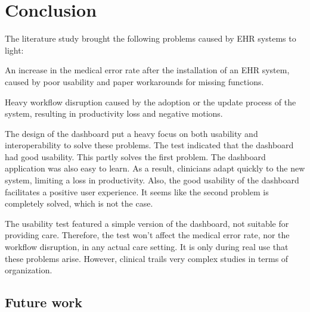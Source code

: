 \section{Conclusion}

The literature study brought the following problems caused by EHR systems to light:
\begin{myitemize}
    \item An increase in the medical error rate after the installation of an EHR system, caused by poor usability and paper workarounds for missing functions.
    \item Heavy workflow disruption caused by the adoption or the update process of the system, resulting in productivity loss and negative motions.
\end{myitemize}

\noindent The design of the dashboard put a heavy focus on both usability and interoperability to solve these problems. The test indicated that the dashboard had good usability. This partly solves the first problem. The dashboard application was also easy to learn. As a result, clinicians adapt quickly to the new system, limiting a loss in productivity. Also, the good usability of the dashboard facilitates a positive user experience. It seems like the second problem is completely solved, which is not the case.

The usability test featured a simple version of the dashboard, not suitable for providing care. Therefore, the test won't affect the medical error rate, nor the workflow disruption, in any actual care setting. It is only during real use that these problems arise. However, clinical trails very complex studies in terms of organization.



    \subsection{Future work}\label{future_work}



